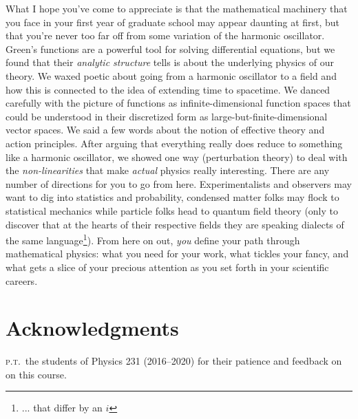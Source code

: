 \documentclass[12pt]{article}
\begin{document}
What I hope you've come to appreciate is that the mathematical machinery that you face in your first year of graduate school may appear daunting at first, but that you're never too far off from some variation of the harmonic oscillator. Green's functions are a powerful tool for solving differential equations, but we found that their \emph{analytic structure} tells is about the underlying physics of our theory. We waxed poetic about going from a harmonic oscillator to a field and how this is connected to the idea of extending time to spacetime. We danced carefully with the picture of functions as infinite-dimensional function spaces that could be understood in their discretized form as large-but-finite-dimensional vector spaces. We said a few words about the notion of effective theory and action principles. After arguing that everything really does reduce to something like a harmonic oscillator, we showed one way (perturbation theory) to deal with the \emph{non-linearities} that make \emph{actual} physics really interesting. There are any number of directions for you to go from here. Experimentalists and observers may want to dig into statistics and probability, condensed matter folks may flock to statistical mechanics while particle folks head to quantum field theory (only to discover that at the hearts of their respective fields they are speaking dialects of the same language\footnote{... that differ by an $i$}). From here on out, \emph{you} define your path through mathematical physics: what you need for your work, what tickles your fancy, and what gets a slice of your precious attention as you set forth in your scientific careers.



\section*{Acknowledgments}
%
\textsc{p.t.}\ the students of Physics 231 (2016--2020) for their patience and feedback on on this course.

\appendix




%



% 
\end{document}
